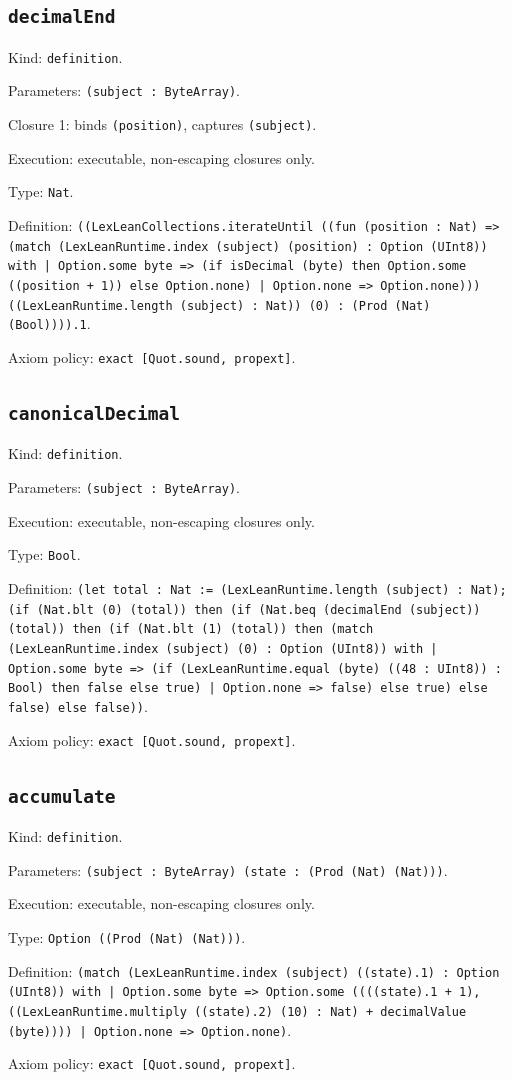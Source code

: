 \documentclass[11pt]{article}
\begin{document}
\subsection*{\texttt{decimalEnd}}
\noindent Kind: \texttt{definition}.\par
\noindent Parameters: \texttt{(subject : ByteArray)}.\par
\noindent Closure 1: binds \texttt{(position)}, captures \texttt{(subject)}.\par
\noindent Execution: executable, non-escaping closures only.\par
\noindent Type: \texttt{Nat}.\par
\noindent Definition: \texttt{((LexLeanCollections.iterateUntil ((fun (position : Nat) => (match (LexLeanRuntime.index (subject) (position) : Option (UInt8)) with | Option.some byte => (if isDecimal (byte) then Option.some ((position + 1)) else Option.none) | Option.none => Option.none))) ((LexLeanRuntime.length (subject) : Nat)) (0) : (Prod (Nat) (Bool)))).1}.\par
\noindent Axiom policy: \texttt{exact [Quot.sound, propext]}.\par
\subsection*{\texttt{canonicalDecimal}}
\noindent Kind: \texttt{definition}.\par
\noindent Parameters: \texttt{(subject : ByteArray)}.\par
\noindent Execution: executable, non-escaping closures only.\par
\noindent Type: \texttt{Bool}.\par
\noindent Definition: \texttt{(let total : Nat := (LexLeanRuntime.length (subject) : Nat); (if (Nat.blt (0) (total)) then (if (Nat.beq (decimalEnd (subject)) (total)) then (if (Nat.blt (1) (total)) then (match (LexLeanRuntime.index (subject) (0) : Option (UInt8)) with | Option.some byte => (if (LexLeanRuntime.equal (byte) ((48 : UInt8)) : Bool) then false else true) | Option.none => false) else true) else false) else false))}.\par
\noindent Axiom policy: \texttt{exact [Quot.sound, propext]}.\par
\subsection*{\texttt{accumulate}}
\noindent Kind: \texttt{definition}.\par
\noindent Parameters: \texttt{(subject : ByteArray) (state : (Prod (Nat) (Nat)))}.\par
\noindent Execution: executable, non-escaping closures only.\par
\noindent Type: \texttt{Option ((Prod (Nat) (Nat)))}.\par
\noindent Definition: \texttt{(match (LexLeanRuntime.index (subject) ((state).1) : Option (UInt8)) with | Option.some byte => Option.some ((((state).1 + 1), ((LexLeanRuntime.multiply ((state).2) (10) : Nat) + decimalValue (byte)))) | Option.none => Option.none)}.\par
\noindent Axiom policy: \texttt{exact [Quot.sound, propext]}.\par
\end{document}
